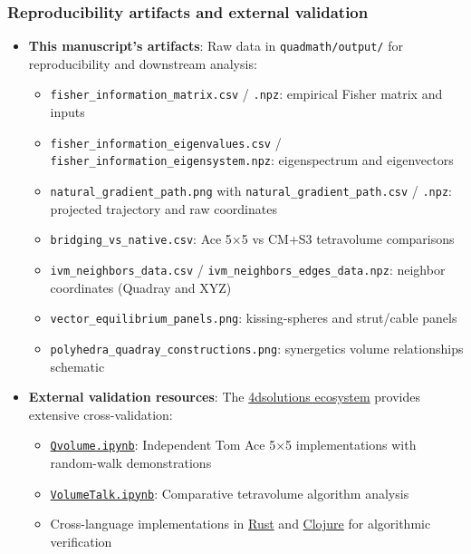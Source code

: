 \documentclass[
  10pt,
]{article}
\providecommand{\tightlist}{%
  \setlength{\itemsep}{0pt}\setlength{\parskip}{0pt}}
\begin{document}
\hypertarget{reproducibility-artifacts-and-external-validation}{%
\subsubsection{Reproducibility artifacts and external
validation}\label{reproducibility-artifacts-and-external-validation}}

\begin{itemize}
\tightlist
\item
  \textbf{This manuscript's artifacts}: Raw data in
  \texttt{quadmath/output/} for reproducibility and downstream analysis:

  \begin{itemize}
  \tightlist
  \item
    \texttt{fisher\_information\_matrix.csv} / \texttt{.npz}: empirical
    Fisher matrix and inputs
  \item
    \texttt{fisher\_information\_eigenvalues.csv} /
    \texttt{fisher\_information\_eigensystem.npz}: eigenspectrum and
    eigenvectors
  \item
    \texttt{natural\_gradient\_path.png} with
    \texttt{natural\_gradient\_path.csv} / \texttt{.npz}: projected
    trajectory and raw coordinates
  \item
    \texttt{bridging\_vs\_native.csv}: Ace 5×5 vs CM+S3 tetravolume
    comparisons
  \item
    \texttt{ivm\_neighbors\_data.csv} /
    \texttt{ivm\_neighbors\_edges\_data.npz}: neighbor coordinates
    (Quadray and XYZ)
  \item
    \texttt{vector\_equilibrium\_panels.png}: kissing-spheres and
    strut/cable panels
  \item
    \texttt{polyhedra\_quadray\_constructions.png}: synergetics volume
    relationships schematic
  \end{itemize}
\item
  \textbf{External validation resources}: The
  \href{https://github.com/4dsolutions}{4dsolutions ecosystem} provides
  extensive cross-validation:

  \begin{itemize}
  \tightlist
  \item
    \href{https://github.com/4dsolutions/School_of_Tomorrow/blob/master/Qvolume.ipynb}{\texttt{Qvolume.ipynb}}:
    Independent Tom Ace 5×5 implementations with random-walk
    demonstrations
  \item
    \href{https://github.com/4dsolutions/School_of_Tomorrow/blob/master/VolumeTalk.ipynb}{\texttt{VolumeTalk.ipynb}}:
    Comparative tetravolume algorithm analysis
  \item
    Cross-language implementations in
    \href{https://github.com/4dsolutions/rusty_rays}{Rust} and
    \href{https://github.com/4dsolutions/synmods}{Clojure} for
    algorithmic verification
  \end{itemize}
\end{itemize}
\end{document}
